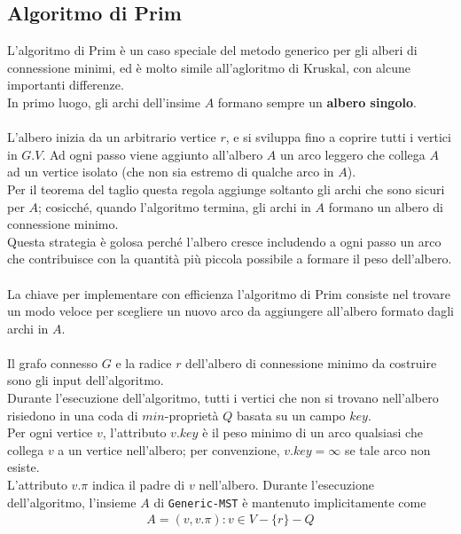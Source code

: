 \subsection{Algoritmo di Prim}
L'algoritmo di Prim è un caso speciale del metodo generico per gli alberi di connessione minimi, ed è molto simile all'agloritmo di Kruskal, con alcune importanti differenze.\\
In primo luogo, gli archi dell'insime $A$ formano sempre un \textbf{albero singolo}.\\\\
L'albero inizia da un arbitrario vertice $r$, e si sviluppa fino a coprire tutti i vertici in $G.V$. Ad ogni passo viene aggiunto all'albero $A$ un arco leggero che collega $A$ ad un vertice isolato (che non sia estremo di qualche arco in $A$).\\
Per il teorema del taglio questa regola aggiunge soltanto gli archi che sono sicuri per $A$; cosicché, quando l'algoritmo termina, gli archi in $A$ formano un albero di connessione minimo.\\
Questa strategia è golosa perché l'albero cresce includendo a ogni passo un arco che contribuisce con la quantità più piccola possibile a formare il peso dell'albero.\\\\
La chiave per implementare con efficienza l'algoritmo di Prim consiste nel trovare un modo veloce per scegliere un nuovo arco da aggiungere all'albero formato dagli archi in $A$.\\\\
Il grafo connesso $G$ e la radice $r$ dell'albero di connessione minimo da costruire sono gli input dell'algoritmo.\\
Durante l'esecuzione dell'algoritmo, tutti i vertici che non si trovano nell'albero risiedono in una coda di $min$-proprietà $Q$ basata su un campo $key$.\\
Per ogni vertice $v$, l'attributo $v.key$ è il peso minimo di un arco qualsiasi che collega $v$ a un vertice nell'albero; per convenzione, $v.key = \infty$ se tale arco non esiste.\\
L'attributo $v.\pi$ indica il padre di $v$ nell'albero. Durante l'esecuzione dell'algoritmo, l'insieme $A$ di \texttt{Generic-MST} è mantenuto implicitamente come
    \begin{equation}\begin{aligned}
        A = {(v, v.\pi): v \in V - \{r\} - Q}
    \end{aligned}\end{equation}
